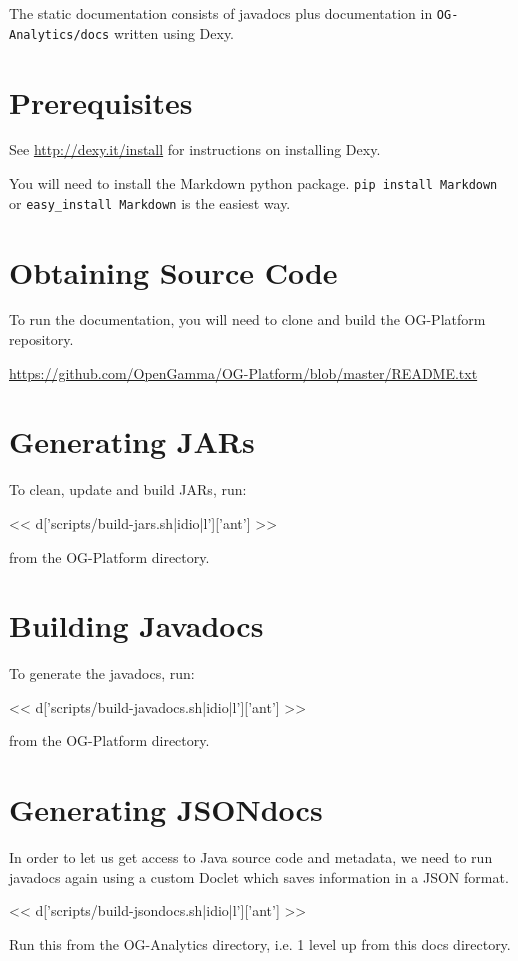 The static documentation consists of javadocs plus documentation in
\verb|OG-Analytics/docs| written using Dexy.

\section{Prerequisites}

See \url{http://dexy.it/install} for instructions on installing Dexy.

You will need to install the Markdown python package.
\verb|pip install Markdown| or \verb|easy_install Markdown| is the easiest way.

\section{Obtaining Source Code}

To run the documentation, you will need to clone and build the OG-Platform repository.

\url{https://github.com/OpenGamma/OG-Platform/blob/master/README.txt}

\section{Generating JARs}

To clean, update and build JARs, run:

<< d['scripts/build-jars.sh|idio|l']['ant'] >>

from the OG-Platform directory.

\section{Building Javadocs}

To generate the javadocs, run:

<< d['scripts/build-javadocs.sh|idio|l']['ant'] >>

from the OG-Platform directory.

\section{Generating JSONdocs}

In order to let us get access to Java source code and metadata, we need to run
javadocs again using a custom Doclet which saves information in a JSON format.

<< d['scripts/build-jsondocs.sh|idio|l']['ant'] >>

Run this from the OG-Analytics directory, i.e. 1 level up from this docs directory.

